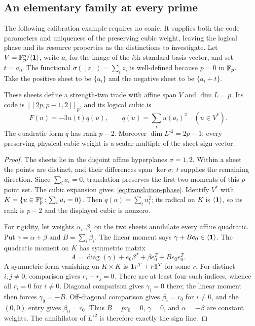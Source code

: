 \subsection{An elementary family at every prime}
The following calibration example requires no conic. It supplies both the code
parameters and uniqueness of the preserving cubic weight, leaving the logical
phase and its resource properties as the distinctions to investigate.
Let $V=\mathbb F_p^p/\langle\mathbf 1\rangle$, write $a_i$ for the image of the $i$th
standard basis vector, and set $t=a_0$. The functional
$\sigma([z])=\sum_i z_i$ is well-defined because $p=0$ in $\mathbb F_p$.
Take the positive sheet to be $\{a_i\}$ and the negative sheet to be
$\{a_i+t\}$.

\begin{proposition}\label{prop:translation}
These sheets define a strength-two trade with affine span $V$ and
$\dim L=p$. Its code is $[[2p,p-1,2]]_p$, and its logical cubic is
\begin{equation}\label{eq:translation-phase}
 F(u)=-3u(t)q(u),\qquad q(u)=\sum_i u(a_i)^2\quad(u\in V^*).
\end{equation}
The quadratic form $q$ has rank $p-2$. Moreover
$\dim L^{\circ2}=2p-1$; every preserving physical cubic weight is a scalar
multiple of the sheet-sign vector.
\end{proposition}
\begin{proof}
The sheets lie in the disjoint affine hyperplanes $\sigma=1,2$.
Within a sheet the points are distinct, and their differences span
$\ker\sigma$; $t$ supplies the remaining direction. Since $\sum_i a_i=0$,
translation preserves the first two moments of this $p$-point set.
The cubic expansion gives~\eqref{eq:translation-phase}.
Identify $V^*$ with $K=\{u\in\mathbb F_p^p:\sum_i u_i=0\}$.
Then $q(u)=\sum_i u_i^2$; its radical on $K$ is $\langle\mathbf 1\rangle$,
so its rank is $p-2$ and the displayed cubic is nonzero.

For rigidity, let weights $\alpha_i,\beta_i$ on the two sheets annihilate
every affine quadratic. Put $\gamma=\alpha+\beta$ and $B=\sum_i\beta_i$.
The linear moment says $\gamma+Be_0\in\langle\mathbf 1\rangle$.
The quadratic moment on $K$ has symmetric matrix
\[
 A=\operatorname{diag}(\gamma)+e_0\beta^T+\beta e_0^T+Be_0e_0^T.
\]
A symmetric form vanishing on $K\times K$ is
$\mathbf 1 r^T+r\mathbf 1^T$ for some $r$. For distinct $i,j\ne0$, comparison gives
$r_i+r_j=0$. There are at least four such indices, whence all $r_i=0$
for $i\ne0$. Diagonal comparison gives $\gamma_i=0$ there; the linear
moment then forces $\gamma_0=-B$. Off-diagonal comparison gives
$\beta_i=r_0$ for $i\ne0$, and the $(0,0)$ entry gives $\beta_0=r_0$.
Thus $B=pr_0=0$, $\gamma=0$, and $\alpha=-\beta$ are constant weights.
The annihilator of $L^{\circ2}$ is therefore exactly the sign line.
\end{proof}

